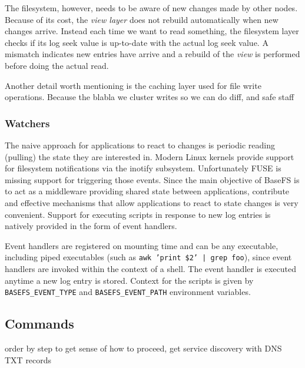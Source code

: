 \documentclass{sig-alternate}
\begin{document}
The filesystem, however, needs to be aware of new changes made by other nodes. Because of its cost, the \textit{view layer} does not rebuild automatically when new changes arrive. Instead each time we want to read something, the filesystem layer checks if its log seek value is up-to-date with the actual log seek value. A mismatch indicates new entries have arrive and a rebuild of the \textit{view} is performed before doing the actual read.

Another detail worth mentioning is the caching layer used for file write operations. Because the blabla we cluster writes so we can do diff, and safe staff

\subsubsection{Watchers}
The naive approach for applications to react to changes is periodic reading (pulling) the state they are interested in. Modern Linux kernels provide support for filesystem notifications via the inotify subsystem. Unfortunately FUSE is missing support for triggering those events. Since the main objective of BaseFS is to act as a middleware providing shared state between applications, contribute and effective mechanisms that allow applications to react to state changes is very convenient. Support for executing scripts in response to new log entries is natively provided in the form of event handlers.

Event handlers are registered on mounting time and can be any executable, including piped executables (such as \texttt{awk '{print \$2}' | grep foo}), since event handlers are invoked within the context of a shell. The event handler is executed anytime a new log entry is stored. Context for the scripts is given by \texttt{BASEFS\_EVENT\_TYPE} and \texttt{BASEFS\_EVENT\_PATH} environment variables. 


\subsection{Commands}

order by step to get sense of how to proceed, get service discovery with DNS TXT records
\end{document}
